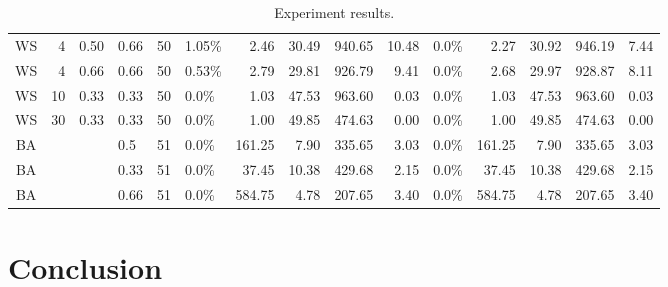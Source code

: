 \documentclass[parskip=half]{scrartcl}
\begin{document}
\begin{sidewaystable}
\begin{tabular}[h]{|c|r|l|l|l|l|r|r|r|r|l|r|r|r|r|}
WS & 4 & 0.50 & 0.66 & 50 & 1.05\% & 2.46 & 30.49 & 940.65 & 10.48 & 0.0\% & 2.27 & 30.92 & 946.19 & 7.44\\
WS & 4 & 0.66 & 0.66 & 50 & 0.53\% & 2.79 & 29.81 & 926.79 & 9.41 & 0.0\%  & 2.68 & 29.97 & 928.87 & 8.11\\
WS & 10 & 0.33 & 0.33 & 50 & 0.0\% & 1.03 & 47.53 & 963.60 & 0.03 & 0.0\%  & 1.03 & 47.53 & 963.60 & 0.03\\
WS & 30 & 0.33 & 0.33 & 50 & 0.0\% & 1.00 & 49.85 & 474.63 & 0.00 & 0.0\%  & 1.00 & 49.85 & 474.63 & 0.00\\
\hline
BA & \multicolumn{2}{|c|}{} & 0.5  & 51 & 0.0\% & 161.25 & 7.90  & 335.65 & 3.03 & 0.0\%  & 161.25 &  7.90 & 335.65 & 3.03\\
BA & \multicolumn{2}{|c|}{} & 0.33 & 51 & 0.0\% &  37.45 & 10.38 & 429.68 & 2.15 & 0.0\%  &  37.45 & 10.38 & 429.68 & 2.15\\
BA & \multicolumn{2}{|c|}{} & 0.66 & 51 & 0.0\% & 584.75 & 4.78  & 207.65 & 3.40 & 0.0\%  & 584.75 &  4.78 & 207.65 & 3.40\\
\hline
\end{tabular}
\caption{\label{tbl_res}Experiment results.}
\end{sidewaystable}

\section{Conclusion}
\label{conclusion}

\printbibliography
\end{document}
